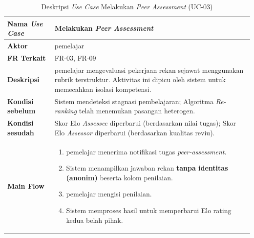 \begin{table}[H]
    \centering
    \caption{Deskripsi \textit{Use Case} Melakukan \textit{Peer Assessment} (UC-03)}
    \label{tbl:desc_uc03}
    \begin{tabular}{|p{}|p{}|}
        \hline
        \textbf{Nama \textit{Use Case}} & \textbf{Melakukan \textit{Peer Assessment}} \\
        \hline
        \textbf{Aktor} & pemelajar \\
        \hline
        \textbf{FR Terkait} & FR-03, FR-09 \\
        \hline
        \textbf{Deskripsi} & pemelajar mengevaluasi pekerjaan rekan sejawat menggunakan rubrik terstruktur. Aktivitas ini dipicu oleh sistem untuk memecahkan isolasi kompetensi. \\
        \hline
        \textbf{Kondisi sebelum} & Sistem mendeteksi stagnasi pembelajaran; Algoritma \textit{Re-ranking} telah menemukan pasangan heterogen. \\
        \hline
        \textbf{Kondisi sesudah} & Skor Elo \textit{Assessee} diperbarui (berdasarkan nilai tugas); Skor Elo \textit{Assessor} diperbarui (berdasarkan kualitas reviu). \\
        \hline
        \textbf{Main Flow} & \begin{enumerate}[noitemsep,topsep=0pt,leftmargin=*]
            \item pemelajar menerima notifikasi tugas \textit{peer-assessment}.
            \item Sistem menampilkan jawaban rekan \textbf{tanpa identitas (anonim)} beserta kolom penilaian.
            \item pemelajar mengisi penilaian.
            \item Sistem memproses hasil untuk memperbarui Elo rating kedua belah pihak.
        \end{enumerate} \\
        \hline
    \end{tabular}
\end{table}